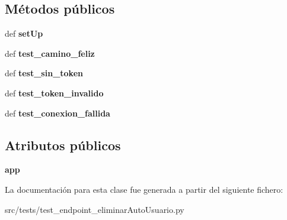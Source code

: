 \subsection*{Métodos públicos}
\begin{DoxyCompactItemize}
\item 
\hypertarget{classsrc_1_1tests_1_1test__endpoint__eliminar_auto_usuario_1_1_test_endpoint_eliminar_auto_usuario_af1c8d2726251de97f8b6a48b7de99863}{def {\bfseries set\-Up}}\label{classsrc_1_1tests_1_1test__endpoint__eliminar_auto_usuario_1_1_test_endpoint_eliminar_auto_usuario_af1c8d2726251de97f8b6a48b7de99863}

\item 
\hypertarget{classsrc_1_1tests_1_1test__endpoint__eliminar_auto_usuario_1_1_test_endpoint_eliminar_auto_usuario_acfa8784062cf572dfd1e7f7f536757f3}{def {\bfseries test\-\_\-camino\-\_\-feliz}}\label{classsrc_1_1tests_1_1test__endpoint__eliminar_auto_usuario_1_1_test_endpoint_eliminar_auto_usuario_acfa8784062cf572dfd1e7f7f536757f3}

\item 
\hypertarget{classsrc_1_1tests_1_1test__endpoint__eliminar_auto_usuario_1_1_test_endpoint_eliminar_auto_usuario_a2132886ba256f862f41a2ced95135264}{def {\bfseries test\-\_\-sin\-\_\-token}}\label{classsrc_1_1tests_1_1test__endpoint__eliminar_auto_usuario_1_1_test_endpoint_eliminar_auto_usuario_a2132886ba256f862f41a2ced95135264}

\item 
\hypertarget{classsrc_1_1tests_1_1test__endpoint__eliminar_auto_usuario_1_1_test_endpoint_eliminar_auto_usuario_af83c93ae26a82afad736a86420281629}{def {\bfseries test\-\_\-token\-\_\-invalido}}\label{classsrc_1_1tests_1_1test__endpoint__eliminar_auto_usuario_1_1_test_endpoint_eliminar_auto_usuario_af83c93ae26a82afad736a86420281629}

\item 
\hypertarget{classsrc_1_1tests_1_1test__endpoint__eliminar_auto_usuario_1_1_test_endpoint_eliminar_auto_usuario_a9db2210a20093499aca87ff79c4100dc}{def {\bfseries test\-\_\-conexion\-\_\-fallida}}\label{classsrc_1_1tests_1_1test__endpoint__eliminar_auto_usuario_1_1_test_endpoint_eliminar_auto_usuario_a9db2210a20093499aca87ff79c4100dc}

\end{DoxyCompactItemize}
\subsection*{Atributos públicos}
\begin{DoxyCompactItemize}
\item 
\hypertarget{classsrc_1_1tests_1_1test__endpoint__eliminar_auto_usuario_1_1_test_endpoint_eliminar_auto_usuario_a8c2056fb13bae1273d95a0af7ee02f81}{{\bfseries app}}\label{classsrc_1_1tests_1_1test__endpoint__eliminar_auto_usuario_1_1_test_endpoint_eliminar_auto_usuario_a8c2056fb13bae1273d95a0af7ee02f81}

\end{DoxyCompactItemize}


La documentación para esta clase fue generada a partir del siguiente fichero\-:\begin{DoxyCompactItemize}
\item 
src/tests/test\-\_\-endpoint\-\_\-eliminar\-Auto\-Usuario.\-py\end{DoxyCompactItemize}
